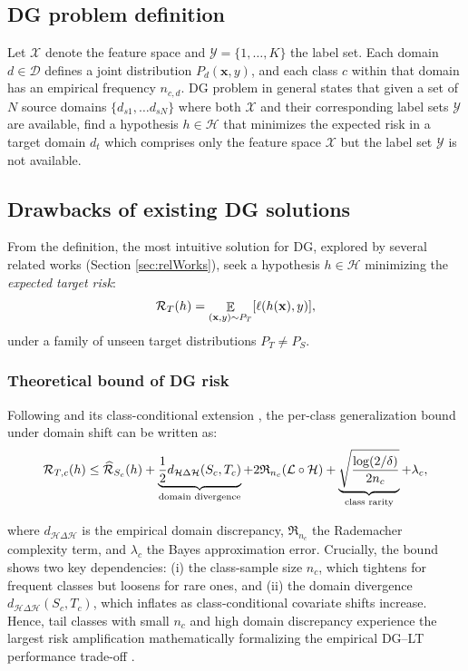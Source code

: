\documentclass[runningheads]{llncs}
\begin{document}
\subsection{DG problem definition}
Let $\mathcal{X}$ denote the feature space and $\mathcal{Y} = \{1, \dots, K\}$ the label set. Each domain $d \in \mathcal{D}$ defines a joint distribution $P_d(\mathbf{x},y)$, and each class $c$ within that domain has an empirical frequency $n_{c,d}$. DG problem in general states that given a set of $N$ source domains $\{d_{s1},\ldots d_{sN}\}$ where both $\mathcal{X}$ and their corresponding label sets $\mathcal{Y}$ are available, find a hypothesis $h \in \mathcal{H}$ that minimizes the expected risk in a target domain $d_t$ which comprises only the feature space $\mathcal{X}$ but the label set $\mathcal{Y}$ is not available.
\subsection{Drawbacks of existing DG solutions}
From the definition, the most intuitive solution for DG, explored by several related works (Section \ref{sec:relWorks}), seek a hypothesis $h \in \mathcal{H}$ minimizing the \textit{expected target risk}:
\begin{equation}
\label{eqn:riskLevel}
\scriptsize
\mathcal{R}_T(h) = \mathop{\mathbb{E}}\limits_{(\mathbf{x},y)\sim P_T}[\ell(h(\mathbf{x}),y)],
\end{equation}
under a family of unseen target distributions $P_T \neq P_S$.

\subsubsection{Theoretical bound of DG risk}
Following \citet{BenDavid10} and its class-conditional extension \cite{Yang22}, the per-class generalization bound under domain shift can be written as:
{\scriptsize
\begin{equation}
\label{eq:classrisk}
\mathcal{R}_{T,c}(h) \le \widehat{\mathcal{R}}_{S_c}(h) + \underbrace{\frac{1}{2}d_{\mathcal{H}\Delta\mathcal{H}}(S_c,T_c)}_\textnormal{domain divergence}
+ 2\mathfrak{R}_{n_c}(\mathcal{L}\circ\mathcal{H}) + \underbrace{\sqrt{\frac{\log(2/\delta)}{2n_c}}}_\textnormal{class rarity} + \lambda_c,
\end{equation}
}

where $d_{\mathcal{H}\Delta\mathcal{H}}$ is the empirical domain discrepancy, $\mathfrak{R}_{n_c}$ the Rademacher complexity term, and $\lambda_c$ the Bayes approximation error. Crucially, the bound shows two key dependencies:
(i) the class-sample size $n_c$, which tightens for frequent classes but loosens for rare ones, and 
(ii) the domain divergence $d_{\mathcal{H}\Delta\mathcal{H}}(S_c,T_c)$, which inflates as class-conditional covariate shifts increase. Hence, tail classes with small $n_c$ and high domain discrepancy experience the largest risk amplification mathematically formalizing the empirical DG–LT performance trade-off \cite{Yang22,Zhang21}.
\end{document}
